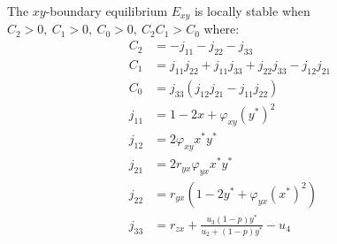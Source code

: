\begin{theorem}\label{thm:eq-boundary-xy-stability}
    The $xy$-boundary equilibrium $E_{xy}$ is locally stable when $C_2>0,\ C_1>0,\ C_0>0,\ C_2C_1>C_0$ where:
    \begin{align*}
        C_2 &= -j_{11}-j_{22}-j_{33}\\
        C_1 &= j_{11}j_{22}+j_{11}j_{33}+j_{22}j_{33}-j_{12}j_{21}\\
        C_0 &= j_{33}\left(j_{12}j_{21}-j_{11}j_{22}\right)\\
        j_{11} &= 1-2x+\varphi_{xy}\left(y^*\right)^2\\
        j_{12} &= 2\varphi_{xy}x^*y^*\\
        j_{21} &= 2r_{yx}\varphi_{yx}x^*y^*\\
        j_{22} &= r_{yx}\left(1-2y^*+\varphi_{yx}\left(x^*\right)^2\right)\\
        j_{33} &= r_{zx}+\frac{u_3\left(1-p\right)y^*}{u_2+\left(1-p\right)y^*}-u_4
    \end{align*}
\end{theorem}
